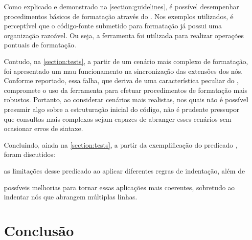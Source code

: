 \documentclass
  [11pt,a4paper,english,brazil,openright,sumario=tradicional,twoside]
  {abntex2}
\begin{document}
  Como explicado e demonstrado na \cref{section:guidelines}, é possível
  desempenhar procedimentos básicos de formatação através do \witchcooking. Nos
  exemplos utilizados, é perceptível que o código-fonte submetido para
  formatação já possui uma organização razoável. Ou seja, a ferramenta foi
  utilizada para realizar operações pontuais de formatação.

  Contudo, na \cref{section:tests}, a partir de um cenário mais complexo de
  formatação, foi apresentado um mau funcionamento na sincronização das
  extensões dos nós. Conforme reportado, essa falha, que deriva de uma
  característica peculiar do \treesitter, compromete o uso da ferramenta para
  efetuar procedimentos de formatação mais robustos. Portanto, ao considerar
  cenários mais realistas, nos quais não é possível presumir algo sobre a
  estruturação inicial do código, não é prudente pressupor que consultas mais
  complexas sejam capazes de abranger esses cenários sem ocasionar erros de
  sintaxe.

  Concluindo, ainda na \cref{section:tests}, a partir da exemplificação do
  predicado , foram discutidos:
  \begin{inparaenum}
    \item as limitações desse predicado ao aplicar diferentes regras de
          indentação, além de
    \item possíveis melhorias para tornar essas aplicações mais coerentes,
          sobretudo ao indentar nós que abrangem múltiplas linhas.
  \end{inparaenum}


  \chapter{Conclusão}
\end{document}
